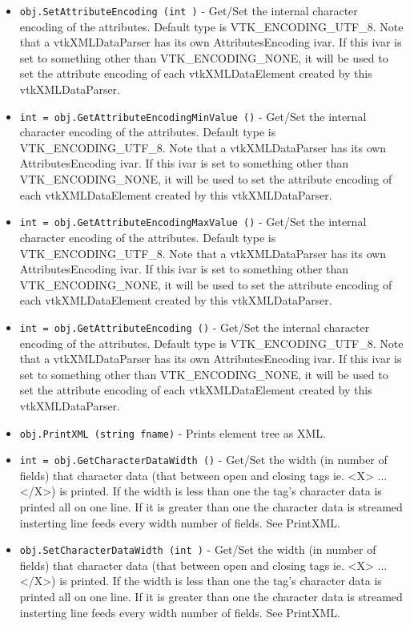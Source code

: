 \begin{itemize}
\item  \verb|obj.SetAttributeEncoding (int )| -  Get/Set the internal character encoding of the attributes.
 Default type is VTK\_ENCODING\_UTF\_8.
 Note that a vtkXMLDataParser has its own AttributesEncoding ivar. If 
 this ivar is set to something other than VTK\_ENCODING\_NONE, it will be
 used to set the attribute encoding of each vtkXMLDataElement 
 created by this vtkXMLDataParser.

\item  \verb|int = obj.GetAttributeEncodingMinValue ()| -  Get/Set the internal character encoding of the attributes.
 Default type is VTK\_ENCODING\_UTF\_8.
 Note that a vtkXMLDataParser has its own AttributesEncoding ivar. If 
 this ivar is set to something other than VTK\_ENCODING\_NONE, it will be
 used to set the attribute encoding of each vtkXMLDataElement 
 created by this vtkXMLDataParser.

\item  \verb|int = obj.GetAttributeEncodingMaxValue ()| -  Get/Set the internal character encoding of the attributes.
 Default type is VTK\_ENCODING\_UTF\_8.
 Note that a vtkXMLDataParser has its own AttributesEncoding ivar. If 
 this ivar is set to something other than VTK\_ENCODING\_NONE, it will be
 used to set the attribute encoding of each vtkXMLDataElement 
 created by this vtkXMLDataParser.

\item  \verb|int = obj.GetAttributeEncoding ()| -  Get/Set the internal character encoding of the attributes.
 Default type is VTK\_ENCODING\_UTF\_8.
 Note that a vtkXMLDataParser has its own AttributesEncoding ivar. If 
 this ivar is set to something other than VTK\_ENCODING\_NONE, it will be
 used to set the attribute encoding of each vtkXMLDataElement 
 created by this vtkXMLDataParser.

\item  \verb|obj.PrintXML (string fname)| -  Prints element tree as XML.

\item  \verb|int = obj.GetCharacterDataWidth ()| -  Get/Set the width (in number of fields) that character
 data (that between open and closing tags ie. <X> ... </X>)
 is printed. If the width is less than one the tag's character
 data is printed all on one line. If it is greater than one
 the character data is streamed insterting line feeds every
 width number of fields. See PrintXML.

\item  \verb|obj.SetCharacterDataWidth (int )| -  Get/Set the width (in number of fields) that character
 data (that between open and closing tags ie. <X> ... </X>)
 is printed. If the width is less than one the tag's character
 data is printed all on one line. If it is greater than one
 the character data is streamed insterting line feeds every
 width number of fields. See PrintXML.

\end{itemize}
